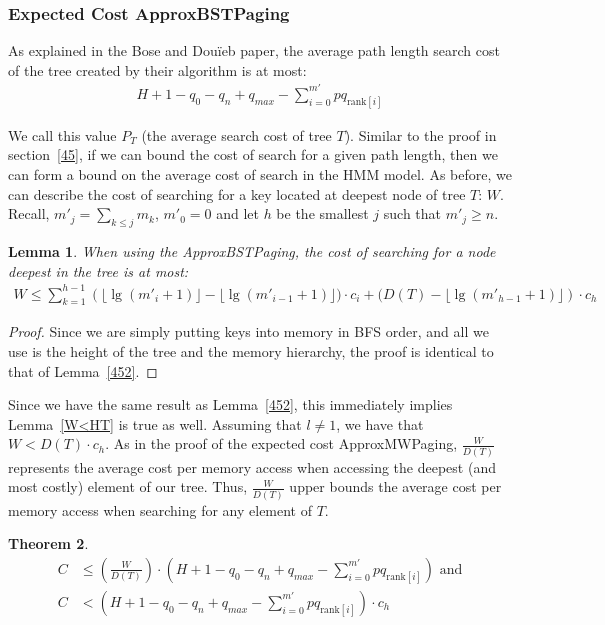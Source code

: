 \documentclass[]{beamer}
\theoremstyle{plain}
\newtheorem{thm}{Theorem}[section]
\newtheorem{lem}[thm]{Lemma}
\begin{document}
\begin{frame} \frametitle{Expected Cost ApproxBSTPaging}\label{48}

As explained in the Bose and Dou\"{i}eb paper, the average path length search cost of the tree created by their algorithm is at most: \cite{bose2009efficient}
\begin{align*}
H + 1 - q_0 - q_n + q_{max} - \sum_{i=0}^{m'} pq_{\text{rank}[i]}
\end{align*}

We call this value $P_T$ (the average search cost of tree $T$). Similar to the proof in section~\ref{45}, if we can bound the cost of search for a given path length, then we can form a bound on the average cost of search in the HMM model. As before, we can describe the cost of searching for a key located at deepest node of tree $T$: $W$. Recall, $m'_j = \sum_{k \leq j} m_k$, $m'_0 = 0$ and let $h$ be the smallest $j$ such that $m'_j \geq n$.

\begin{lem} 
When using the ApproxBSTPaging, the cost of searching for a node deepest in the tree is at most:
\begin{align*}
W \leq \sum_{k=1}^{h-1} \left(\lfloor \lg(m'_i+1) \rfloor - \lfloor \lg(m'_{i-1}+1) \rfloor)\cdot c_i+ (D(T) - \lfloor \lg(m'_{h-1}+1) \rfloor \right)\cdot c_h
\end{align*}
\end{lem}

\begin{proof}
Since we are simply putting keys into memory in BFS order, and all we use is the height of the tree and the memory hierarchy, the proof is identical to that of Lemma~\ref{452}.
\end{proof}

Since we have the same result as Lemma~\ref{452}, this immediately implies Lemma~\ref{W<HT} is true as well. Assuming that $l \neq 1$, we have that $W<D(T)\cdot c_h$. As in the proof of the expected cost ApproxMWPaging, $\frac{W}{D(T)}$ represents the average cost per memory access when accessing the deepest (and most costly) element of our tree. Thus, $\frac{W}{D(T)}$ upper bounds the average cost per memory access when searching for any element of $T$.
\\

\begin{thm} \label{ApproxBSTThm}
\begin{align*}
C &\leq  (\frac{W}{D(T)}) \cdot  (H + 1 - q_0 - q_n + q_{max} - \sum_{i=0}^{m'} pq_{\text{rank}[i]}) \text{ and} \\
C &<  (H + 1 - q_0 - q_n + q_{max} - \sum_{i=0}^{m'} pq_{\text{rank}[i]})\cdot c_h
\end{align*}
\end{thm}


\end{frame}
\end{document}
